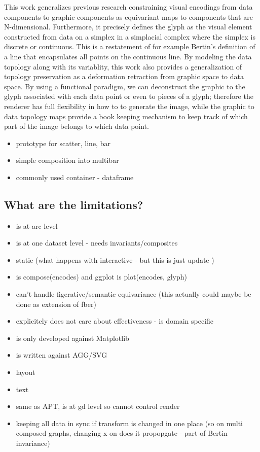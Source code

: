 \documentclass[../main.tex]{subfiles}
\begin{document}
This work generalizes previous research constraining visual encodings from data components to graphic components as equivariant maps to components that are N-dimensional. Furthermore, it precisely defines the glyph as the visual element constructed from data on a simplex in a simplacial complex where the simplex is discrete or continuous. This is a restatement of for example Bertin's definition of a line that encapsulates all points on the continuous line.  By modeling the data topology along with its variablity, this work also provides  a generalization of topology preservation as a deformation retraction from graphic space to data space. By using a functional paradigm, we can deconstruct the graphic to the glyph associated with each data point or even to pieces of a glyph; therefore the renderer has full  flexibility in how to to generate the image, while the graphic to data topology maps provide a book keeping mechanism to keep track of which part of the image belongs to which data point. 

 \begin{itemize}
    \item prototype for scatter, line, bar
    \item simple composition into multibar
    \item commonly used container - dataframe
 \end{itemize}

\subsection{What are the limitations?}
\begin{itemize}
\item is at arc level
\item is at one dataset level - needs invariants/composites
\item static (what happens with interactive - but this is just update )
\item is compose(encodes) and ggplot is plot(encodes, glyph)
\item can't handle figerative/semantic equivariance (this actually could maybe be done as extension of fber)
\item explicitely does not care about effectiveness - is domain specific 
\item is only developed against Matplotlib
\item is written against AGG/SVG
\item layout
\item text
\item same as APT, is at gd level so cannot control render 
\item keeping all data in sync if transform is changed in one place (so on multi composed graphs, changing x on does it propopgate - part of Bertin invariance)
\end{itemize}
\end{document}
